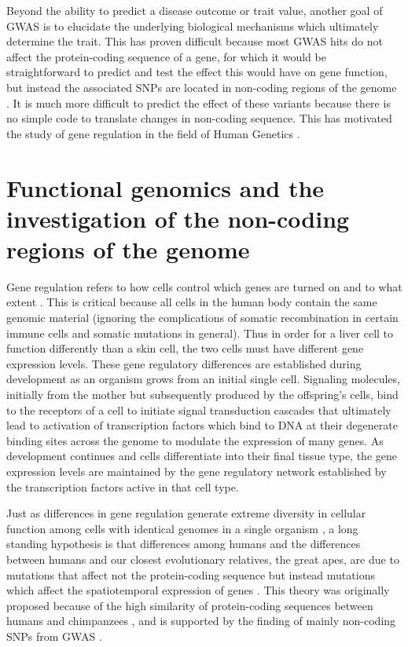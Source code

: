 Beyond the ability to predict a disease outcome or trait value,
another goal of GWAS is to elucidate the underlying biological
mechanisms which ultimately determine the trait. This has proven
difficult because most GWAS hits do not affect the protein-coding
sequence of a gene, for which it would be straightforward to predict
and test the effect this would have on gene function, but instead the
associated SNPs are located in non-coding regions of the genome \citep{Hindorff2009, Manolio2009}. It is
much more difficult to predict the effect of these variants because
there is no simple code to translate changes in non-coding
sequence. This has motivated the study of gene regulation in the field
of Human Genetics \citep{Lappalainen2010, Trynka2013, Civelek2014, Lappalainen2015}.

\section{Functional genomics and the investigation of the non-coding regions of the genome}

Gene regulation refers to how cells control which genes are turned on
and to what extent \citep{Davidson2010, Natoli2010, Strachan2011, Ostuni2013, Tsankov2015}. This is critical because all cells in the human
body contain the same genomic material (ignoring the complications of
somatic recombination in certain immune cells and somatic mutations in
general). Thus in order for a liver cell to function differently than
a skin cell, the two cells must have different gene expression
levels. These gene regulatory differences are established during
development as an organism grows from an initial single
cell. Signaling molecules, initially from the mother but subsequently
produced by the offspring's cells, bind to the receptors of a cell to
initiate signal transduction cascades that ultimately lead to
activation of transcription factors which bind to DNA at their
degenerate binding sites across the genome to modulate the expression
of many genes. As development continues and cells differentiate into
their final tissue type, the gene expression levels are maintained by
the gene regulatory network established by the transcription factors
active in that cell type.

Just as differences in gene regulation generate extreme diversity in
cellular function among cells with identical genomes in a single
organism \citep{Natoli2010}, a long standing hypothesis is that differences among humans
and the differences between humans and our closest evolutionary
relatives, the great apes, are due to mutations that affect not the
protein-coding sequence but instead mutations which affect the
spatiotemporal expression of genes \citep{Britten1969, King1975, Carroll2008}. This theory was originally
proposed because of the high similarity of protein-coding sequences
between humans and chimpanzees \citep{King1975}, and is supported by the finding of
mainly non-coding SNPs from GWAS \citep{Welter2014}.

